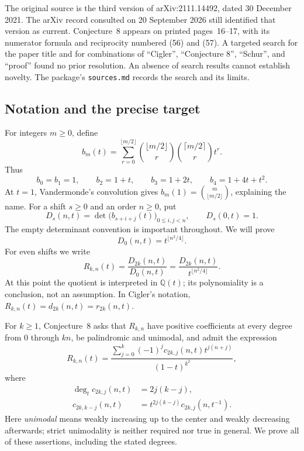\documentclass[11pt,a4paper]{article}
\theoremstyle{definition}
\theoremstyle{remark}
\newcommand{\Q}{\mathbb Q}
\numberwithin{equation}{section}
\begin{document}
The original source is the third version of arXiv:2111.14492, dated
30 December 2021. The arXiv record consulted on 20 September 2026 still
identified that version as current. Conjecture~8 appears on printed
pages~16--17, with its numerator formula and reciprocity numbered (56)
and (57). A targeted search for the paper title and for combinations of
``Cigler'', ``Conjecture 8'', ``Schur'', and ``proof'' found no prior
resolution. An absence of search results cannot establish novelty.
The package's \texttt{sources.md} records the search and its limits.

\subsection{Notation and the precise target}
For integers \(m\ge0\), define
\begin{equation}
 b_m(t)=\sum_{r=0}^{\lfloor m/2\rfloor}
 \binom{\lfloor m/2\rfloor}{r}
 \binom{\lceil m/2\rceil}{r}t^r.
 \label{eq:moment}
\end{equation}
Thus
\[
 b_0=b_1=1,\qquad b_2=1+t,\qquad b_3=1+2t,\qquad
 b_4=1+4t+t^2.
\]
At \(t=1\), Vandermonde's convolution gives
\(b_m(1)=\binom{m}{\lfloor m/2\rfloor}\), explaining the name.
For a shift \(s\ge0\) and an order \(n\ge0\), put
\begin{equation}
 D_s(n,t)=\det\bigl(b_{s+i+j}(t)\bigr)_{0\le i,j<n},
 \qquad D_s(0,t)=1.
 \label{eq:hankel}
\end{equation}
The empty determinant convention is important throughout. We will prove
\begin{equation}
 D_0(n,t)=t^{\lfloor n^2/4\rfloor}.
 \label{eq:unshifted}
\end{equation}
For even shifts we write
\begin{equation}
 R_{k,n}(t)=\frac{D_{2k}(n,t)}{D_0(n,t)}
 =\frac{D_{2k}(n,t)}{t^{\lfloor n^2/4\rfloor}}.
 \label{eq:normalization}
\end{equation}
At this point the quotient is interpreted in \(\Q(t)\); its polynomiality
is a conclusion, not an assumption. In Cigler's notation,
\(R_{k,n}(t)=d_{2k}(n,t)=r_{2k}(n,t)\).

For \(k\ge1\), Conjecture~8 asks that \(R_{k,n}\) have positive coefficients
at every degree from \(0\) through \(kn\), be palindromic and unimodal, and
admit the expression
\begin{equation}
 R_{k,n}(t)=
 \frac{\displaystyle\sum_{j=0}^{k}(-1)^j
 c_{2k,j}(n,t)t^{j(n+j)}}{(1-t)^{k^2}},
 \label{eq:target-numerator}
\end{equation}
where
\begin{align}
 \deg_t c_{2k,j}(n,t)&=2j(k-j),\label{eq:target-degree}\\
 c_{2k,k-j}(n,t)&=t^{2j(k-j)}c_{2k,j}(n,t^{-1}).
 \label{eq:target-reciprocity}
\end{align}
Here \emph{unimodal} means weakly increasing up to the center and weakly
decreasing afterwards; strict unimodality is neither required nor true in
general. We prove all of these assertions, including the stated degrees.
\end{document}
